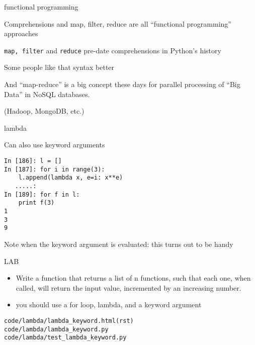 \documentclass{beamer}
\begin{document}
\begin{frame}[fragile]{functional programming}

\vfill
{\Large Comprehensions and map, filter, reduce are all ``functional programming'' approaches}

\vfill
{\Large \verb|map, filter| and \verb|reduce| pre-date comprehensions in Python's history}

\vfill
{\Large Some people like that syntax better}

\vfill
{\Large And ``map-reduce'' is a big concept these days for parallel processing of ``Big Data'' in NoSQL databases.}

\vfill
{\Large (Hadoop, MongoDB, etc.) }

\end{frame} 


\begin{frame}[fragile]{lambda}

{\Large Can also use keyword arguments}

\begin{verbatim}
In [186]: l = []
In [187]: for i in range(3):
    l.append(lambda x, e=i: x**e)
   .....:     
In [189]: for f in l:
    print f(3)
1
3
9
\end{verbatim}

{\Large Note when the keyword argument is evaluated: this turns out to be handy}

\end{frame} 
\begin{frame}[fragile]{LAB}


\vfill
\begin{itemize}
  \item Write a function that returns a list of n functions,
such that each one, when called, will return the input value,
incremented by an increasing number.

  \item you should use a for loop, lambda, and a keyword argument
\end{itemize}

\vfill
\verb|code/lambda/lambda_keyword.html(rst)| \\
\verb|code/lambda/lambda_keyword.py| \\
\verb|code/lambda/test_lambda_keyword.py| \\

\end{frame}
\end{document}
